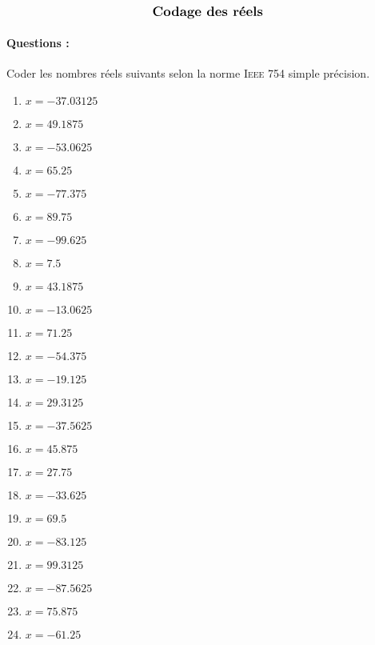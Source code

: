 \documentclass[11pt,a4paper]{article}
\begin{document}
\entete

\autoevaluation


$$\mbox{\textbf{\large Codage des réels}}$$


\paragraph{Questions :}
Coder les nombres réels suivants selon la norme \textsc{Ieee} 754 simple précision.
\vspace*{3mm}


\noindent
\begin{minipage}{4.5cm}
\begin{enumerate}
\item $x = -37.03125$
\item $x = 49.1875$
\item $x = -53.0625$
\item $x = 65.25$
\item $x = -77.375$
\item $x = 89.75$
\item $x = -99.625$
\item $x = 7.5$
\end{enumerate}
\end{minipage}
\hfill
\begin{minipage}{4.5cm}
\begin{enumerate}\setcounter{enumi}{8}
\item $x = 43.1875$
\item $x = -13.0625$
\item $x = 71.25$
\item $x = -54.375$
\item $x = -19.125$
\item $x = 29.3125$
\item $x = -37.5625$
\item $x = 45.875$
\end{enumerate}
\end{minipage}
\hfill
\begin{minipage}{4.5cm}
\begin{enumerate}\setcounter{enumi}{16}
\item $x = 27.75$
\item $x = -33.625$
\item $x = 69.5$
\item $x = -83.125$
\item $x = 99.3125$
\item $x = -87.5625$
\item $x = 75.875$
\item $x = -61.25$
\end{enumerate}
\end{minipage}
\vspace*{3mm}
\end{document}
